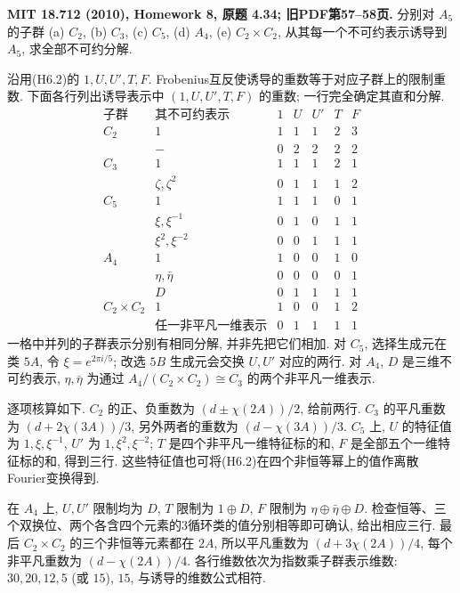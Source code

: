 \begin{exercise}\label{hw:4.34}
\textbf{MIT 18.712 (2010), Homework 8, 原题 4.34; 旧PDF第57--58页.}
分别对 $A_5$ 的子群 (a) $C_2$, (b) $C_3$, (c) $C_5$, (d) $A_4$, (e) $C_2\times C_2$, 从其每一个不可约表示诱导到 $A_5$, 求全部不可约分解.
\end{exercise}
\begin{solution}
沿用(H6.2)的 $1,U,U',T,F$. Frobenius互反使诱导的重数等于对应子群上的限制重数. 下面各行列出诱导表示中 $(1,U,U',T,F)$ 的重数; 一行完全确定其直和分解.
\[
\begin{array}{c|c|rrrrr}
\text{子群}&\text{其不可约表示}&1&U&U'&T&F\\\hline
C_2&1&1&1&1&2&3\\
&-&0&2&2&2&2\\\hline
C_3&1&1&1&1&2&1\\
&\zeta,\zeta^2&0&1&1&1&2\\\hline
C_5&1&1&1&1&0&1\\
&\xi,\xi^{-1}&0&1&0&1&1\\
&\xi^2,\xi^{-2}&0&0&1&1&1\\\hline
A_4&1&1&0&0&1&0\\
&\eta,\bar\eta&0&0&0&0&1\\
&D&0&1&1&1&1\\\hline
C_2\times C_2&1&1&0&0&1&2\\
&\text{任一非平凡一维表示}&0&1&1&1&1
\end{array}                                                     \tag{H8.1}
\]
一格中并列的子群表示分别有相同分解, 并非先把它们相加. 对 $C_5$, 选择生成元在类 $5A$, 令 $\xi=e^{2\pi i/5}$; 改选 $5B$ 生成元会交换 $U,U'$ 对应的两行. 对 $A_4$, $D$ 是三维不可约表示, $\eta,\bar\eta$ 为通过 $A_4/(C_2\times C_2)\cong C_3$ 的两个非平凡一维表示.

逐项核算如下. $C_2$ 的正、负重数为 $(d\pm\chi(2A))/2$, 给前两行. $C_3$ 的平凡重数为 $(d+2\chi(3A))/3$, 另外两者的重数为 $(d-\chi(3A))/3$. $C_5$ 上, $U$ 的特征值为 $1,\xi,\xi^{-1}$, $U'$ 为 $1,\xi^2,\xi^{-2}$; $T$ 是四个非平凡一维特征标的和, $F$ 是全部五个一维特征标的和, 得到三行. 这些特征值也可将(H6.2)在四个非恒等幂上的值作离散Fourier变换得到.

在 $A_4$ 上, $U,U'$ 限制均为 $D$, $T$ 限制为 $1\oplus D$, $F$ 限制为 $\eta\oplus\bar\eta\oplus D$. 检查恒等、三个双换位、两个各含四个元素的3循环类的值分别相等即可确认, 给出相应三行. 最后 $C_2\times C_2$ 的三个非恒等元素都在 $2A$, 所以平凡重数为 $(d+3\chi(2A))/4$, 每个非平凡重数为 $(d-\chi(2A))/4$. 各行维数依次为指数乘子群表示维数: $30,20,12,5$ (或 $15$), $15$, 与诱导的维数公式相符.
\end{solution}

